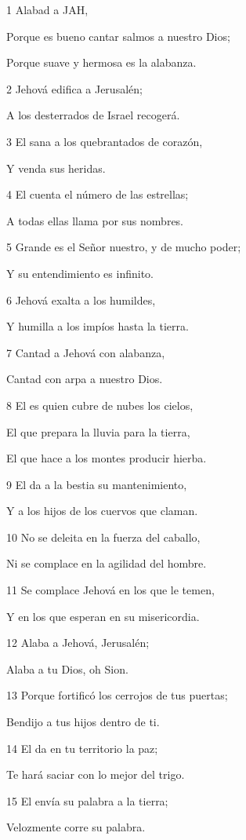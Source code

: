 \par 1 Alabad a JAH,
\par Porque es bueno cantar salmos a nuestro Dios;
\par Porque suave y hermosa es la alabanza.
\par 2 Jehová edifica a Jerusalén;
\par A los desterrados de Israel recogerá.
\par 3 El sana a los quebrantados de corazón,
\par Y venda sus heridas.
\par 4 El cuenta el número de las estrellas;
\par A todas ellas llama por sus nombres.
\par 5 Grande es el Señor nuestro, y de mucho poder;
\par Y su entendimiento es infinito.
\par 6 Jehová exalta a los humildes,
\par Y humilla a los impíos hasta la tierra.
\par 7 Cantad a Jehová con alabanza,
\par Cantad con arpa a nuestro Dios.
\par 8 El es quien cubre de nubes los cielos,
\par El que prepara la lluvia para la tierra,
\par El que hace a los montes producir hierba.
\par 9 El da a la bestia su mantenimiento,
\par Y a los hijos de los cuervos que claman.
\par 10 No se deleita en la fuerza del caballo,
\par Ni se complace en la agilidad del hombre.
\par 11 Se complace Jehová en los que le temen,
\par Y en los que esperan en su misericordia.
\par 12 Alaba a Jehová, Jerusalén;
\par Alaba a tu Dios, oh Sion.
\par 13 Porque fortificó los cerrojos de tus puertas;
\par Bendijo a tus hijos dentro de ti.
\par 14 El da en tu territorio la paz;
\par Te hará saciar con lo mejor del trigo.
\par 15 El envía su palabra a la tierra;
\par Velozmente corre su palabra.
